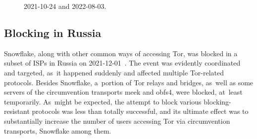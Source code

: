 \documentclass[letterpaper,twocolumn]{article}
\begin{document}
\begin{figure}
\begin{minipage}[t][\textheight][b]{\linewidth}
{%
\mbox{2021-10-24} and \mbox{2022-08-03}.
\label{fig:client-counts-tm}
}
\end{minipage}
\end{figure}

\subsection{Blocking in Russia}
\label{sec:block-ru}


Snowflake, along with other common ways of accessing Tor,
was blocked in a subset of ISPs in Russia
on \mbox{2021-12-01}~\cite{ooni-2021-russia-blocks-tor}.
The event was evidently coordinated and targeted,
as~it happened suddenly and affected multiple Tor-related protocols.
Besides Snowflake,
a~portion of Tor relays and bridges,
as~well as some servers of
the circumvention transports meek and obfs4,
were blocked, at~least temporarily.
As~might be expected, the attempt to block
various blocking-resistant protocols
was less than totally successful,
and its ultimate effect was to substantially increase the number
of users accessing Tor via circumvention transports,
Snowflake among them.
\end{document}
